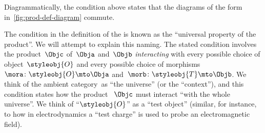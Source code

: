 \begin{marginfigure}
    \centering
    \caption{}
    \label{fig:prod-def-diagram}
\end{marginfigure}

\begin{remark}
    \label{re:prod-comm-diag}
    Diagrammatically, the condition above states that the diagrams of the form in~\cref{fig:prod-def-diagram} commute.
\end{remark}

\begin{marginfigure}
    \centering
    \caption{}
    \label{fig:prod-def-diagram-generic}
\end{marginfigure}

\begin{remark}
    The condition in the definition of the  is known as the ``universal property of the product''.
    We will attempt to explain this naming.
    The stated condition involves the product~$\Objc$ of~$\Obja$ and~$\Objb$ \emph{interacting} with every possible choice of object~$\styleobj{O}$ and every possible choice of morphisms~$\mora \colon \styleobj{O} \mto \Obja$ and~$\morb\colon \styleobj{T} \mto \Objb$.
    We think of the ambient category~\CatC as ``the universe'' (or the ``context''), and this condition states how the product ~$\Objc$ must interact ``with the whole universe''.
    We think of ``$\styleobj{O}$'' as a ``test object'' (similar, for instance, to how in electrodynamics a ``test charge'' is used to probe an electromagnetic field).
\end{remark}



